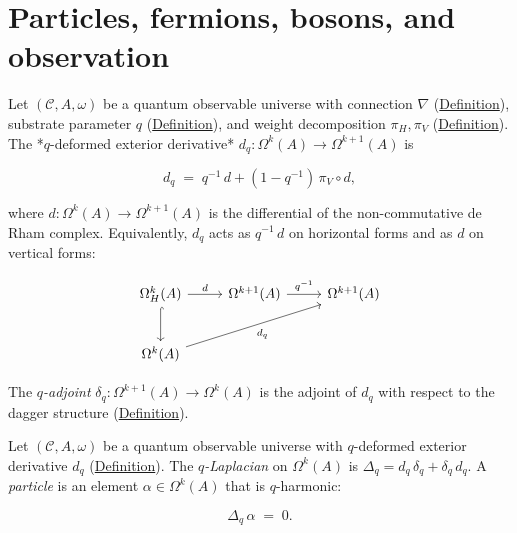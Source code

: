 \section{Particles, fermions, bosons, and observation}
\label{sec:particles}

\begin{definition}
  \label{def:categorical-q-ext-deriv}
Let $(\mathcal{C}, A, \omega)$ be a quantum observable universe with
connection $\nabla$ (\hyperref[def:categorical-connection]{Definition}),
substrate parameter $q$ (\hyperref[def:substrate-parameter]{Definition}),
and weight decomposition $\pi_H, \pi_V$
(\hyperref[def:weight-decomposition]{Definition}).  The *$q$-deformed
exterior derivative* $d_q \colon \Omega^k(A) \to \Omega^{k+1}(A)$ is

\[
d_q \;=\; q^{-1}\,d + (1 - q^{-1})\,\pi_V \circ d,
\]

where $d \colon \Omega^k(A) \to \Omega^{k+1}(A)$ is the differential
of the non-commutative de Rham complex.  Equivalently, $d_q$ acts as
$q^{-1}\,d$ on horizontal forms and as $d$ on vertical forms:

\begin{equation}\label{eq:categorical-dq-cd}
\begin{tikzcd}[row sep=2.5em, column sep=2.5em]
  \Omega^k_H(A) \ar[r, "d"] \ar[d, hook]
  & \Omega^{k+1}(A) \ar[r, "q^{-1}"]
  & \Omega^{k+1}(A) \\
  \Omega^k(A) \ar[rru, "d_q"']
\end{tikzcd}
\end{equation}

The \emph{$q$-adjoint} $\delta_q \colon \Omega^{k+1}(A) \to \Omega^k(A)$
is the adjoint of $d_q$ with respect to the dagger structure
(\hyperref[def:positive-definite-dagger]{Definition}).
\end{definition}

\begin{definition}[Particle]
  \label{def:q-harmonic-form}
Let $(\mathcal{C}, A, \omega)$ be a quantum observable universe with
$q$-deformed exterior derivative $d_q$
(\hyperref[def:categorical-q-ext-deriv]{Definition}).  The \emph{$q$-Laplacian}
on $\Omega^k(A)$ is $\Delta_q = d_q\,\delta_q + \delta_q\,d_q$.
A \emph{particle} is an element $\alpha \in \Omega^k(A)$ that is
$q$-harmonic:

\[
\Delta_q\,\alpha \;=\; 0.
\]
\end{definition}

